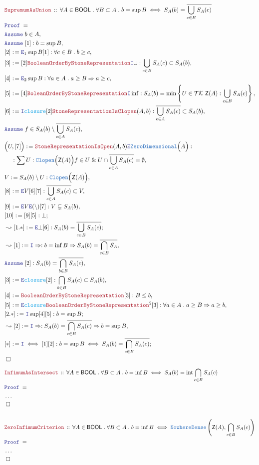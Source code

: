 \documentclass[12pt]{scrartcl}
\newcommand{\TYPE}[1]{\textcolor{NavyBlue}{\mathtt{#1}}}
\newcommand{\FUNC}[1]{\textcolor{Cerulean}{\mathtt{#1}}}
\newcommand{\LOGIC}[1]{\textcolor{Blue}{\mathtt{#1}}}
\newcommand{\THM}[1]{\textcolor{Maroon}{\mathtt{#1}}}
\renewcommand{\.}{\; . \;}
\newcommand{\de}{: \kern 0.1pc =}
\newcommand{\Theorem}[2]{& \THM{#1} \, :: \, #2 \\ & \Proof = \\ }
\newcommand{\NewLine}{\\ & \kern 1pc}
\newcommand{\Page}[1]{ \begin{align*} #1 \end{align*}   }
\newcommand{\NoProof}{ & \ldots \\ \EndProof}
\renewcommand{\And}{\; \& \;}
\newcommand{\Imply}{\Rightarrow}
\newcommand{\Intro}{\LOGIC{I}}
\newcommand{\Elim}{\LOGIC{E}}
\newcommand{\Say}[3]{& #1 \de #2 : #3, \\}
\newcommand{\Conclude}[3]{& #1 \de #2 : #3; \\}
\newcommand{\Derive}[3]{& \leadsto #1 \de #2 : #3, \\}
\newcommand{\DeriveConclude}[3]{& \leadsto #1 \de #2 : #3 ; \\}
\newcommand{\Assume}[2]{& \LOGIC{Assume} \; #1 : #2, \\}
\newcommand{\AssumeIn}[2]{& \LOGIC{Assume} \; #1 \in #2, \\}
\newcommand{\QED}{\; \square}
\newcommand{\EndProof}{& \QED \\}
\newcommand{\Proof}{\LOGIC{Proof} \; }
\newcommand{\Clopen}{\TYPE{Clopen}}
\newcommand{\ND}{\TYPE{NowhereDense}}
\DeclareMathOperator*{\intx}{int}
\newcommand{\TK}{\mathcal{TK}}
\newcommand{\BOOL}{\mathsf{BOOL}}
\newcommand{\Z}{\mathsf{Z}}
\begin{document}
\Page{
	\Theorem{SupremumAsUnion}
	{
		\forall A \in \BOOL \.
		\forall B \subset A \.
		b = \sup B 
		\iff 
		S_A(b) =  \overline{\bigcup_{c \in B} S_A(c) }
	}
	\AssumeIn{b}{A}
	\Assume{[1]}{b = \sup B}
	\Say{[2]}{\Elim_1 \sup B [1]}{\forall c \in B \. b \ge c}
	\Say{[3]}{[2]\THM{BooleanOrderByStoneRepresentation}\Intro \cup}
	{
		\bigcup_{c \in B} S_A(c) \subset  S_A(b) 
	}
	\Say{[4]}{ \Elim_2 \sup B  }{ \forall a \in A \. a \ge B \Imply a \ge c  }
	\Say{[5]}{[4]\THM{BoleanOrderByStoneRepresentation} \Intro \inf }
	{
		S_A(b) = \min\left\{  U \in \TK\;\Z(A) : \bigcup_{c \in B} S_A(c)  \right\}
	}
	\Say{[6]}{\Intro \FUNC{closure}[2]\THM{StoneRepresentationIsClopen}(A,b)}
	{
		\overline{\bigcup_{c \in A} S_A(c)} \subset S_A(b)
	}
	\AssumeIn{f}{ S_A(b) \setminus \overline{\bigcup_{c \in A} S_A(c)}    }
	\Say{\Big(U,[7]\Big)}{\THM{StoneRepresentationIsOpen}(A,b)\Elim \TYPE{ZeroDimensional}\Big(A\Big)}
	{
		\NewLine :
		\sum U : \Clopen\Big( \Z(A) \Big) f \in U \And 
		U \cap \overline{\bigcup_{c \in A} S_A(c)} = \emptyset
	}
	\Say{V}{S_A(b) \setminus U}{\Clopen\Big( \Z(A) \Big)}
	\Say{[8]}{\Elim V [6][7]}{ \overline{\bigcup_{c \in A} S_A(c)} \subset V  }
	\Say{[9]}{\Elim V \Elim (\setminus) [7]}{ V \subsetneq S_A(b)}
	\Conclude{[10]}{[9][5]}{\bot}
	\DeriveConclude{[1.*]}{\Elim \bot [6]}{ S_A(b) = \overline{\bigcup_{c \in B} S_A(c)}}
	\Derive{[1]}{\Intro \Imply}{ b = \inf B \Imply S_A(b) = \overline{\bigcap_{c \in B} S_A}         }
	\Assume{[2]}{ S_A(b) = \overline{\bigcap_{b \in B} S_A(c)}   }
	\Say{[3]}{\Elim \FUNC{closure}[2]}{\bigcap_{b \in B} S_A(c) \subset S_A(b)  }
	\Say{[4]}{\THM{BooleanOrderByStoneRepresentation}[3]}{  B \le b  }
	\Say{[5]}{\Elim \FUNC{closure} \THM{BooleanOrderByStoneRepresentation}^2[3] }
	{
		\forall a \in A \. a \ge B \Imply  a \ge b
	}
	\Conclude{[2.*]}{\Intro \sup [4][5]}{ b = \sup B}
	\Derive{[2]}{\Intro \Imply}
	{
		S_A(b) = \overline{\bigcap_{c \in B} S_A(c)} 
		\Imply
		b = \sup B
	}
	\Conclude{[*]}{\Intro \iff [1][2]}
	{
		b = \sup B \iff S_A(b) = \overline{\bigcap_{c \in B} S_A(c)}
	}
	\EndProof
}\Page{
	\Theorem{InfimumAsIntersect}
	{
		\forall A \in \BOOL \.
		\forall B \subset A \.
		b = \inf B 
		\iff 
		S_A(b) =  \intx \bigcap_{c \in B} S_A(c) 
	}
	\NoProof
	\\
	\Theorem{ZeroInfimumCriterion}
	{
		\forall A \in \BOOL \.
		\forall B \subset A \.
		b = \inf B 
		\iff 
		\ND\left( \Z(A) ,\bigcap_{c \in B} S_A(c) \right)
	}
	\NoProof
	\\
}
\newpage
\end{document}
